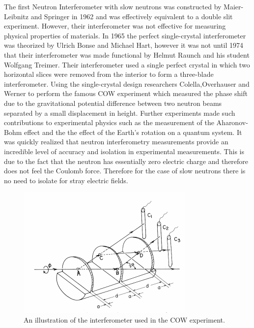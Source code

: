 The first Neutron Interferometer with slow neutrons was constructed by Maier-Leibnitz and Springer in 1962 and was effectively equivalent to a double slit experiment. However, their interferometer was not effective for measuring physical properties of materials. In 1965 the perfect single-crystal interferometer was theorized by Ulrich Bonse and Michael Hart, however it was not until 1974 that their interferometer was made functional by Helmut Raunch and his student Wolfgang Treimer. Their interferometer used a single perfect crystal in which two horizontal slices were removed from the interior to form a three-blade interferometer.\cite{neutron_history} Using the single-crystal design researchers Colella,Overhauser and Werner to perform the famous COW experiment which measured the phase shift due to the gravitational potential difference between two neutron beams separated by a small displacement in height.\cite{cow} Further experiments made such contributions to experimental physics such as the measurement of the Aharonov-Bohm effect and the the effect of the Earth's rotation on a quantum system.\cite{neutron_history} It was quickly realized that neutron interferometry measurements provide an incredible level of accuracy and isolation in experimental measurements. This is due to the fact that the neutron has essentially zero electric charge and therefore does not feel the Coulomb force. Therefore for the case of slow neutrons there is no need to isolate for stray electric fields. 
\begin{figure}[ht!]
\centering
\includegraphics[scale=1.0]{Figures/cow.png}
\caption{An illustration of the interferometer used in the COW experiment.\cite{cow}}
\label{fig:cow}
\end{figure}

